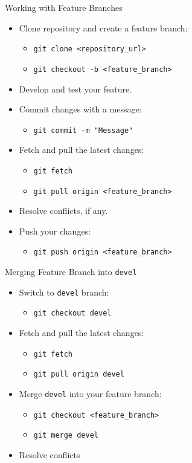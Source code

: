 \begin{frame}{Working with Feature Branches}
  \begin{itemize}
    \item Clone repository and create a feature branch:
      \begin{itemize}
        \item \texttt{git clone <repository\_url>}
        \item \texttt{git checkout -b <feature\_branch>}
      \end{itemize}
    \item Develop and test your feature.
    \item Commit changes with a message:
      \begin{itemize}
        \item \texttt{git commit -m "Message"}
      \end{itemize}
    \item Fetch and pull the latest changes:
      \begin{itemize}
        \item \texttt{git fetch}
        \item \texttt{git pull origin <feature\_branch>}
      \end{itemize}
    \item Resolve conflicts, if any.
    \item Push your changes:
      \begin{itemize}
        \item \texttt{git push origin <feature\_branch>}
      \end{itemize}
  \end{itemize}
\end{frame}

\begin{frame}{Merging Feature Branch into \texttt{devel}}
  \begin{itemize}
    \item Switch to \texttt{devel} branch:
      \begin{itemize}
        \item \texttt{git checkout devel}
      \end{itemize}
    \item Fetch and pull the latest changes:
      \begin{itemize}
        \item \texttt{git fetch}
        \item \texttt{git pull origin devel}
      \end{itemize}
    \item Merge \texttt{devel} into your feature branch:
      \begin{itemize}
        \item \texttt{git checkout <feature\_branch>}
        \item \texttt{git merge devel}
      \end{itemize}
    \item Resolve conflicts
   \end{itemize}
\end{frame}
 

